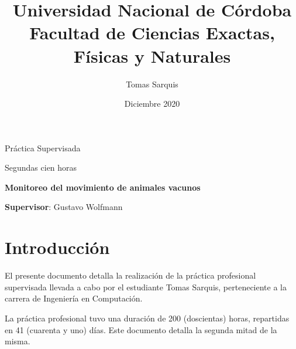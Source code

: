 \documentclass{article}
\title{Universidad Nacional de Córdoba\\Facultad de Ciencias Exactas, Físicas y Naturales}
\author{Tomas Sarquis}
\date{Diciembre 2020}
\begin{document}

    \begin{titlingpage}
        \maketitle
        \null \null \null \null 
        
        \begin{center}
            {\huge Práctica Supervisada}
        \end{center}
        
        \begin{center}
            {\huge Segundas cien horas}
        \end{center}
        
        
        \null \null \null \null 
        
        \begin{center}
            {\large \textbf{Monitoreo del movimiento de animales vacunos}}
        \end{center}
        
        \begin{center}
            {\large \textbf{Supervisor}: Gustavo Wolfmann }
        \end{center}

    \end{titlingpage}


    \tableofcontents 


    \newpage
    \section{Introducción}

    El presente documento detalla la realización de la práctica profesional
    supervisada llevada a cabo por el estudiante Tomas Sarquis, perteneciente 
    a la carrera de Ingeniería en Computación. \par

    La práctica profesional tuvo una duración de 200 (doscientas) horas, 
    repartidas en 41 (cuarenta y  uno) días. Este documento detalla la segunda
    mitad de la misma. \par
\end{document}
